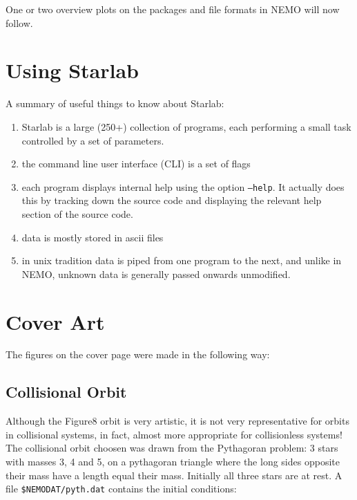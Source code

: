 One or two overview plots on the packages and file formats in NEMO will now follow.


\chapter                {Using Starlab}

A summary of useful things to know about Starlab:


\begin{enumerate}

\item
Starlab is a large (250+) collection of programs, each performing a small task
controlled by a set of parameters.

\item
the command line user interface (CLI) is a set of flags

\item
each program displays internal help using the option {\tt --help}.
It actually does this by tracking down the source code
and displaying the relevant help section of the source code.

\item
data is mostly stored in ascii files

\item
in unix tradition data is piped from one program to the next, and unlike
in NEMO, unknown data is generally passed onwards unmodified.

\end{enumerate}

\chapter                {Cover Art}

The figures on the cover page were made in the following way:

\section{Collisional Orbit}

Although the Figure8 orbit is very artistic, it is not very representative
for orbits in collisional systems, in fact, almost more appropriate
for collisionless systems!
The collisional orbit choosen was drawn from the Pythagoran problem:
3 stars with masses 3, 4 and 5, on a pythagoran triangle where the
long sides opposite their mass have a length equal their mass. Initially
all three stars are at rest. A file {\tt \$NEMODAT/pyth.dat} contains
the initial conditions:


